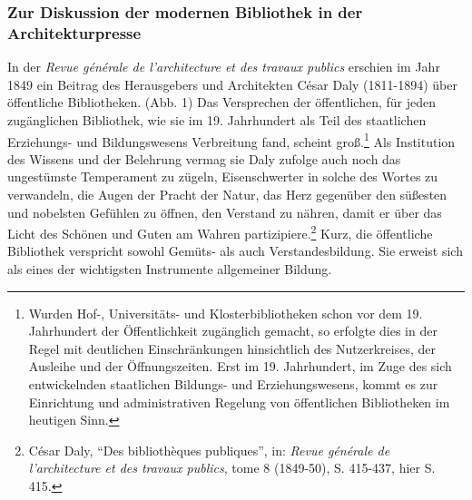 \subsubsection{Zur Diskussion der modernen Bibliothek in der
Architekturpresse}\label{zur-diskussion-der-modernen-bibliothek-in-der-architekturpresse}

In der \emph{Revue générale de l'architecture et des travaux publics}
erschien im Jahr 1849 ein Beitrag des Herausgebers und Architekten César
Daly (1811-1894) über öffentliche Bibliotheken. (Abb. 1) Das Versprechen
der öffentlichen, für jeden zugänglichen Bibliothek, wie sie im 19.
Jahrhundert als Teil des staatlichen Erziehungs- und Bildungswesens
Verbreitung fand, scheint groß.\footnote{Wurden Hof-, Universitäts- und
  Klosterbibliotheken schon vor dem 19. Jahrhundert der Öffentlichkeit
  zugänglich gemacht, so erfolgte dies in der Regel mit deutlichen
  Einschränkungen hinsichtlich des Nutzerkreises, der Ausleihe und der
  Öffnungszeiten. Erst im 19. Jahrhundert, im Zuge des sich
  entwickelnden staatlichen Bildungs- und Erziehungswesens, kommt es zur
  Einrichtung und administrativen Regelung von öffentlichen Bibliotheken
  im heutigen Sinn.} Als Institution des Wissens und der Belehrung
vermag sie Daly zufolge auch noch das ungestümste Temperament zu zügeln,
Eisenschwerter in solche des Wortes zu verwandeln, die Augen der Pracht
der Natur, das Herz gegenüber den süßesten und nobelsten Gefühlen zu
öffnen, den Verstand zu nähren, damit er über das Licht des Schönen und
Guten am Wahren partizipiere.\footnote{César Daly, \enquote{Des
  bibliothèques publiques}, in: \emph{Revue générale de l'architecture
  et des travaux publics}, tome 8 (1849-50), S. 415-437, hier S. 415.}
Kurz, die öffentliche Bibliothek verspricht sowohl Gemüts- als auch
Verstandesbildung. Sie erweist sich als eines der wichtigsten
Instrumente allgemeiner Bildung.

